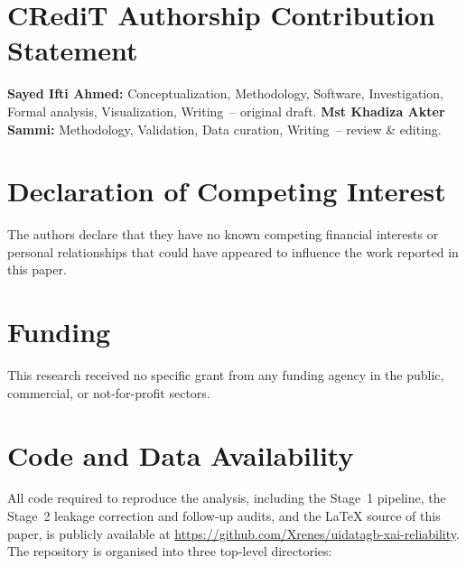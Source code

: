 \section*{CRediT Authorship Contribution Statement}
\textbf{Sayed Ifti Ahmed:} Conceptualization, Methodology, Software, Investigation, Formal analysis, Visualization, Writing~-- original draft. \textbf{Mst Khadiza Akter Sammi:} Methodology, Validation, Data curation, Writing~-- review \& editing.

\section*{Declaration of Competing Interest}
The authors declare that they have no known competing financial interests or personal relationships that could have appeared to influence the work reported in this paper.

\section*{Funding}
This research received no specific grant from any funding agency in the public, commercial, or not-for-profit sectors.

\section*{Code and Data Availability}

All code required to reproduce the analysis, including the Stage~1 pipeline, the Stage~2 leakage correction and follow-up audits, and the LaTeX source of this paper, is publicly available at \url{https://github.com/Xrenes/uidatagb-xai-reliability}. The repository is organised into three top-level directories:

